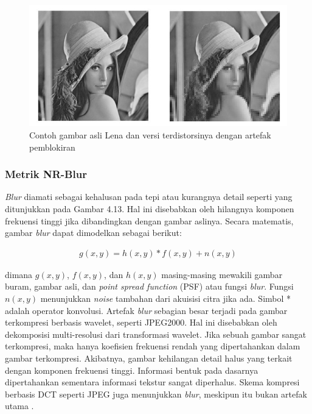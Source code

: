 \begin{figure}[H]
	\vspace{-0.1cm}
	\begin{center}
		\includegraphics[width=0.9\columnwidth]{bab2/Gambar/Contoh gambar asli Lena dan versi terdistorsinya dengan artefak pemblokiran.jpg}
	\end{center}
	\vspace{-0.2cm}
	\caption{Contoh gambar asli Lena dan versi terdistorsinya dengan artefak pemblokiran \citep{Kusuma2005}}\label{Contoh gambar asli Lena dan versi terdistorsinya dengan artefak pemblokiran}
\end{figure}


\subsubsection{Metrik NR-Blur}

\textit{Blur} diamati sebagai kehalusan pada tepi atau kurangnya detail seperti yang ditunjukkan pada Gambar 4.13. Hal ini disebabkan oleh hilangnya komponen frekuensi tinggi jika dibandingkan dengan gambar aslinya. Secara matematis, gambar \textit{blur} dapat dimodelkan sebagai berikut:

\begin{equation}
	\begin{aligned}
		g(x,y)=h(x,y)*f(x,y)+n(x,y)
	\end{aligned}
\end{equation}

dimana $g(x,y)$, $f(x,y)$, dan $h(x,y)$ masing-masing mewakili gambar buram, gambar asli, dan \textit{point spread function} (PSF) atau fungsi \textit{blur}. Fungsi $n(x,y)$ menunjukkan \textit{noise} tambahan dari akuisisi citra jika ada. Simbol * adalah operator konvolusi. Artefak \textit{blur} sebagian besar terjadi pada gambar terkompresi berbasis wavelet, seperti JPEG2000. Hal ini disebabkan oleh dekomposisi multi-resolusi dari transformasi wavelet. Jika sebuah gambar sangat terkompresi, maka hanya koefisien frekuensi rendah yang dipertahankan dalam gambar terkompresi. Akibatnya, gambar kehilangan detail halus yang terkait dengan komponen frekuensi tinggi. Informasi bentuk pada dasarnya dipertahankan sementara informasi tekstur sangat diperhalus. Skema kompresi berbasis DCT seperti JPEG juga menunjukkan \textit{blur}, meskipun itu bukan artefak utama \citep{Kusuma2005}.


